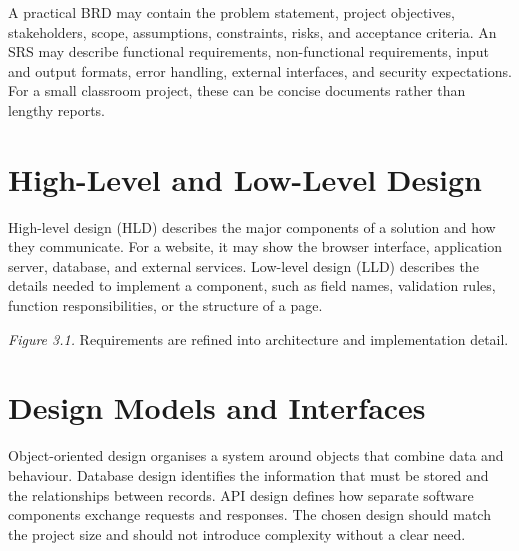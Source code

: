 \documentclass[11pt,openany,oneside]{book}
\begin{document}
A practical BRD may contain the problem statement, project objectives, stakeholders, scope, assumptions, constraints, risks, and acceptance criteria. An SRS may describe functional requirements, non-functional requirements, input and output formats, error handling, external interfaces, and security expectations. For a small classroom project, these can be concise documents rather than lengthy reports.

\section{High-Level and Low-Level Design}
High-level design (HLD) describes the major components of a solution and how they communicate. For a website, it may show the browser interface, application server, database, and external services. Low-level design (LLD) describes the details needed to implement a component, such as field names, validation rules, function responsibilities, or the structure of a page.

\begin{center}
\end{center}
\textit{Figure 3.1.} Requirements are refined into architecture and implementation detail.

\section{Design Models and Interfaces}
Object-oriented design organises a system around objects that combine data and behaviour. Database design identifies the information that must be stored and the relationships between records. API design defines how separate software components exchange requests and responses. The chosen design should match the project size and should not introduce complexity without a clear need.
\end{document}

